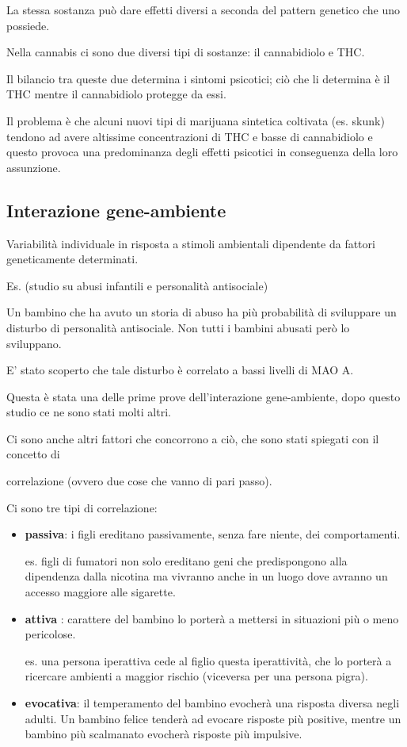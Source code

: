 La stessa sostanza può dare effetti diversi a seconda del pattern
genetico che uno possiede.

Nella cannabis ci sono due diversi tipi di sostanze: il cannabidiolo e
THC.

Il bilancio tra queste due determina i sintomi psicotici; ciò che li
determina è il THC mentre il cannabidiolo protegge da essi.

Il problema è che alcuni nuovi tipi di marijuana sintetica coltivata
(es. skunk) tendono ad avere altissime concentrazioni di THC e basse di
cannabidiolo e questo provoca una predominanza degli effetti psicotici
in conseguenza della loro assunzione.

\subsection{Interazione gene-ambiente}

Variabilità individuale in risposta a stimoli ambientali dipendente da
fattori geneticamente determinati.

Es. (studio su abusi infantili e personalità antisociale)

Un bambino che ha avuto un storia di abuso ha più probabilità di
sviluppare un disturbo di personalità antisociale. Non tutti i bambini
abusati però lo sviluppano.

E' stato scoperto che tale disturbo è correlato a bassi livelli di MAO
A.

Questa è stata una delle prime prove dell'interazione gene-ambiente,
dopo questo studio ce ne sono stati molti altri.

Ci sono anche altri fattori che concorrono a ciò, che sono stati
spiegati con il concetto di

correlazione (ovvero due cose che vanno di pari passo).

Ci sono tre tipi di correlazione:

\begin{itemize}
\item
  \textbf{passiva}: i figli ereditano passivamente, senza fare niente,
  dei comportamenti.

es. figli di fumatori non solo ereditano geni che predispongono alla
dipendenza dalla nicotina ma vivranno anche in un luogo dove avranno un
accesso maggiore alle sigarette.

\item
  \textbf{attiva} : carattere del bambino lo porterà a mettersi in
  situazioni più o meno pericolose.

es. una persona iperattiva cede al figlio questa iperattività, che lo
porterà a ricercare ambienti a maggior rischio (viceversa per una
persona pigra).

\item
  \textbf{evocativa}: il temperamento del bambino evocherà una risposta
  diversa negli adulti. Un bambino felice tenderà ad evocare risposte
  più positive, mentre un bambino più scalmanato evocherà risposte più
  impulsive.
\end{itemize}

